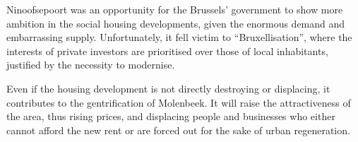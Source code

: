 \documentclass{article}[11pt]
\begin{document}
\parencite{https://www.ieb.be/Porte-de-Ninove-bientot-une-victoire-contre-la-speculation-fonciere-et-pour-le}


Ninoofsepoort was an opportunity for the Brussels' government to show more ambition in the social housing developments, given the enormous demand and embarrassing supply. Unfortunately, it fell victim to ``Bruxellisation'', where the interests of private investors are prioritised over those of local inhabitants, justified by the necessity to modernise. 

Even if the housing development is not directly destroying or displacing, it contributes to the gentrification of Molenbeek. It will raise the attractiveness of the area, thus rising prices, and displacing people and businesses who either cannot afford the new rent or are forced out for the sake of urban regeneration.

\pagebreak

\printbibliography 
\end{document}
